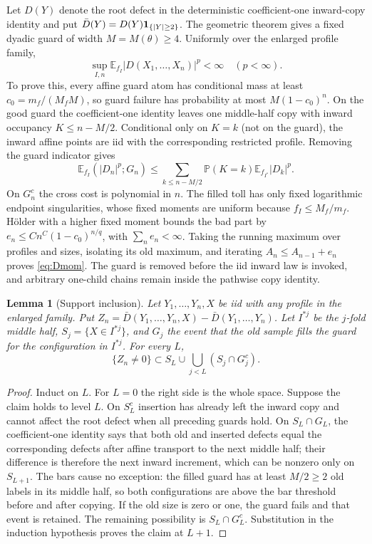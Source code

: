 \documentclass[11pt]{article}
\numberwithin{equation}{section}
\newtheorem{lemma}[theorem]{Lemma}
\newcommand{\E}{\mathbb E}\newcommand{\Pp}{\mathbb P}
\newcommand{\1}{\mathbf 1}\newcommand{\F}{\mathcal F}\newcommand{\D}{\mathcal D}
\begin{document}
Let $D(Y)$ denote the root defect in the deterministic coefficient-one
inward-copy identity and put $\bar D(Y)=D(Y){\bf1}_{\{|Y|\ge2\}}$.
The geometric theorem gives a fixed dyadic guard of width
$M=M(\theta)\ge4$.  Uniformly over the enlarged profile family,
\begin{equation}\label{eq:Dmom}
 \sup_{I,n}\E_{f_I}|D(X_1,\ldots,X_n)|^p<\infty
 \quad(p<\infty).
\end{equation}
To prove this, every affine guard atom has conditional mass at least
$c_0=m_f/(M_fM)$, so guard failure has probability at most
$M(1-c_0)^n$.  On the good guard the coefficient-one identity leaves one
middle-half copy with inward occupancy $K\le n-M/2$.  Conditional only on
$K=k$ (not on the guard), the inward affine points are iid with the
corresponding restricted profile.  Removing the guard indicator gives
\[
 \E_{f_I}(|D_n|^p;G_n)\le
 \sum_{k\le n-M/2}\Pp(K=k)\E_{f_{I^*}}|D_k|^p.
\]
On $G_n^c$ the cross cost is polynomial in $n$.  The filled toll has only
fixed logarithmic endpoint singularities, whose fixed moments are uniform
because $f_I\le M_f/m_f$.  H\"older with a higher fixed moment bounds the
bad part by $e_n\le Cn^C(1-c_0)^{n/q}$, with $\sum_ne_n<\infty$.
Taking the running maximum over profiles and sizes, isolating its old
maximum, and iterating $A_n\le A_{n-1}+e_n$ proves \eqref{eq:Dmom}.
The guard is removed before the iid inward law is invoked, and arbitrary
one-child chains remain inside the pathwise copy identity.

\begin{lemma}[Support inclusion]\label{lem:support}
Let $Y_1,\ldots,Y_n,X$ be iid with any profile in the enlarged family.
Put $Z_n=\bar D(Y_1,\ldots,Y_n,X)-\bar D(Y_1,\ldots,Y_n)$.  Let $I^{*j}$ be the $j$-fold
middle half, $S_j=\{X\in I^{*j}\}$, and $G_j$ the event that the old sample
fills the guard for the configuration in $I^{*j}$.  For every $L$,
\begin{equation}\label{eq:support}
 \{Z_n\ne0\}\subset S_L\cup\bigcup_{j<L}(S_j\cap G_j^c).
\end{equation}
\end{lemma}
\begin{proof}
Induct on $L$.  For $L=0$ the right side is the whole space.  Suppose the
claim holds to level $L$.  On $S_L^c$ insertion has already left the inward
copy and cannot affect the root defect when all preceding guards hold.  On
$S_L\cap G_L$, the coefficient-one identity says that both old and inserted
defects equal the corresponding defects after affine transport to the next
middle half; their difference is therefore the next inward increment, which
can be nonzero only on $S_{L+1}$.  The bars cause no exception: the filled
guard has at least $M/2\ge2$ old labels in its middle half, so both
configurations are above the bar threshold before and after copying.  If the
old size is zero or one, the guard fails and that event is retained.  The
remaining possibility is $S_L\cap G_L^c$.  Substitution in the induction
hypothesis proves the claim
at $L+1$.
\end{proof}
\end{document}
